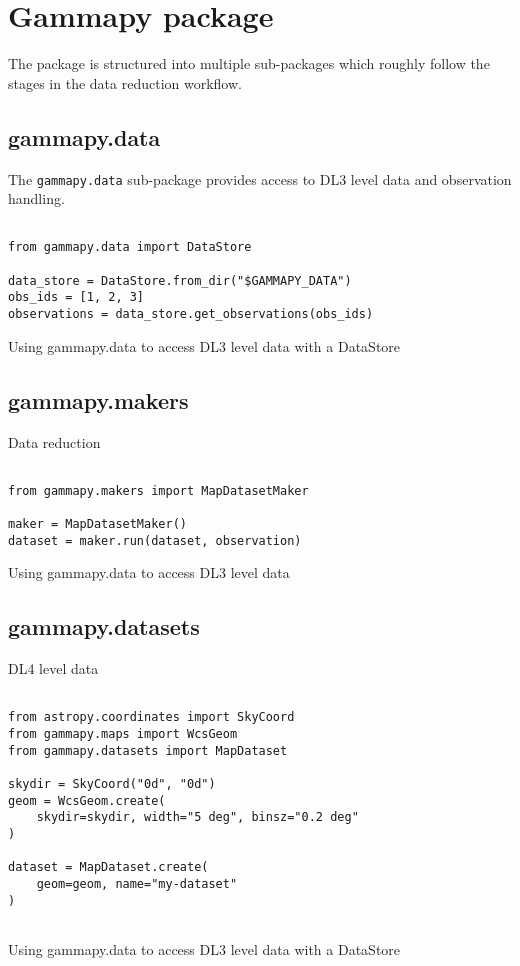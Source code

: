 \section{Gammapy package}
\label{sec:package}

The \gammapy package is structured into multiple sub-packages
which roughly follow the stages in the data reduction workflow.


\subsection{gammapy.data}
The \verb|gammapy.data| sub-package provides access to
DL3 level data and observation handling.


\begin{listing}
\begin{verbatim}

from gammapy.data import DataStore

data_store = DataStore.from_dir("$GAMMAPY_DATA")
obs_ids = [1, 2, 3]
observations = data_store.get_observations(obs_ids)

\end{verbatim}
\caption{Using gammapy.data to access DL3 level data with a DataStore}
\label{codeexample:data}
\end{listing}



\subsection{gammapy.makers}
Data reduction

\begin{listing}
\begin{verbatim}

from gammapy.makers import MapDatasetMaker

maker = MapDatasetMaker()
dataset = maker.run(dataset, observation)

\end{verbatim}
\caption{Using gammapy.data to access DL3 level data}
\label{codeexample:maker}
\end{listing}


\subsection{gammapy.datasets}
DL4 level data


\begin{listing}
\begin{verbatim}

from astropy.coordinates import SkyCoord
from gammapy.maps import WcsGeom
from gammapy.datasets import MapDataset

skydir = SkyCoord("0d", "0d")
geom = WcsGeom.create(
	skydir=skydir, width="5 deg", binsz="0.2 deg"
)

dataset = MapDataset.create(
	geom=geom, name="my-dataset"
)


\end{verbatim}
\caption{Using gammapy.data to access DL3 level data with a DataStore}
\label{codeexample:data}
\end{listing}



